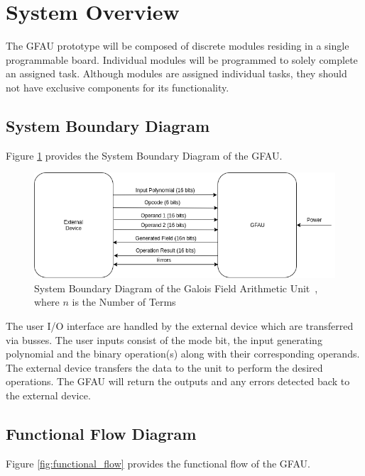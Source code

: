 \documentclass[12pt]{extarticle}
\newcommand{\team}{Galois Field Arithmetic Unit}
\begin{document}
        \section{System Overview} The GFAU prototype will be composed of
        discrete modules residing in a single programmable board. Individual
        modules will be programmed to solely complete an assigned task.
        Although modules are assigned individual tasks, they should not have
        exclusive components for its functionality.

        \subsection{System Boundary Diagram} Figure \ref{fig:system_boundary} provides the System Boundary Diagram of the GFAU.

        \begin{figure}[ht]
            \begin{center}
                \includegraphics[width=1\textwidth]{system_boundary.png}
                \caption{System Boundary Diagram of the \team~, where $n$ is
                the Number of Terms} \label{fig:system_boundary}
            \end{center}
        \end{figure}

        The user I/O interface are handled by the external device which are
        transferred via busses. The user inputs consist of the mode bit, the
        input generating polynomial and the binary operation(s) along with
        their corresponding operands. The external device transfers the data to
        the unit to perform the desired operations. The GFAU will return the
        outputs and any errors detected back to the external device.
        \newpage

        \subsection{Functional Flow Diagram} Figure \ref{fig:functional_flow}
        provides the functional flow of the GFAU.
\end{document}
